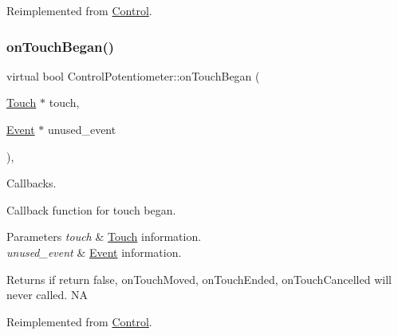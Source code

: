 Reimplemented from \hyperlink{classControl_a0cf2e20cea5b57b263e965be4a19ab52}{Control}.

\mbox{\label{classControlPotentiometer_a92d549b600c44bed4fd08d5ff13cbe8e}} 
\subsubsection{\texorpdfstring{on\+Touch\+Began()}{onTouchBegan()}\hspace{0.1cm}{\footnotesize\ttfamily [2/2]}}
{\footnotesize\ttfamily virtual bool Control\+Potentiometer\+::on\+Touch\+Began (\begin{DoxyParamCaption}\item[{\hyperlink{classTouch}{Touch} $\ast$}]{touch,  }\item[{\hyperlink{classEvent}{Event} $\ast$}]{unused\+\_\+event }\end{DoxyParamCaption})\hspace{0.3cm}{\ttfamily [override]}, {\ttfamily [virtual]}}



Callbacks. 

Callback function for touch began.


\begin{DoxyParams}{Parameters}
{\em touch} & \hyperlink{classTouch}{Touch} information. \\
\hline
{\em unused\+\_\+event} & \hyperlink{classEvent}{Event} information. \\
\hline
\end{DoxyParams}
\begin{DoxyReturn}{Returns}
if return false, on\+Touch\+Moved, on\+Touch\+Ended, on\+Touch\+Cancelled will never called.  NA 
\end{DoxyReturn}


Reimplemented from \hyperlink{classControl_a0cf2e20cea5b57b263e965be4a19ab52}{Control}.

\mbox{\label{classControlPotentiometer_adfd4029e5b390ba94a0ba0373adbc5d9}} 
